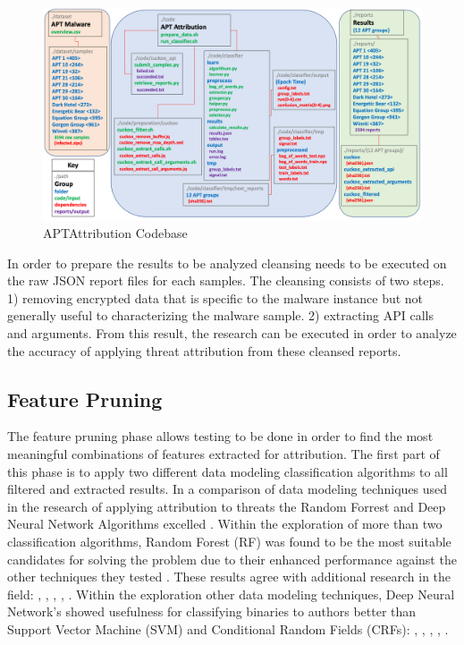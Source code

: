 \documentclass[12pt]{report}
\begin{document}
\begin{figure}
	\centering
	\includegraphics[width=1\textwidth]{images/APTAttribution-codebase.png}
	\caption{APTAttribution Codebase \protect\cite{APTAttribution2022}}
	\label{fig:APTAttribution-codebase}
\end{figure}

In order to prepare the results to be analyzed cleansing needs to be executed on the raw JSON report files for each samples.  The cleansing consists of two steps.  1) removing encrypted data that is specific to the malware instance but not generally useful to characterizing the malware sample.  2) extracting API calls and arguments.  From this result, the research can be executed in order to analyze the accuracy of applying threat attribution from these cleansed reports.

\subsection{Feature Pruning}

The feature pruning phase allows testing to be done in order to find the most meaningful combinations of features extracted for attribution.  The first part of this phase is to apply two different data modeling classification algorithms to all filtered and extracted results.  In a comparison of data modeling techniques used in the research of applying attribution to threats the Random Forrest and Deep Neural Network Algorithms excelled \cite{gray2021identifying}.  Within the exploration of more than two classification algorithms, Random Forest (RF) was found to be the most suitable candidates for solving the problem due to their enhanced performance against the other techniques they tested  \cite{hong2018classifying}.  These results agree with additional research in the field: \cite{hendrikse2017effect}, \cite{caliskan2015coding}, \cite{kalgutkar2018android}, \cite{meng2016fine}, \cite{gonzalez2018authorship}.  Within the exploration other data modeling techniques, Deep Neural Network's showed usefulness for classifying binaries to authors better than Support Vector Machine (SVM) and Conditional Random Fields (CRFs): \cite{meng2018binary}, \cite{rosenberg2017deepapt}, \cite{rosenberg2018end}, \cite{alrabaee2019feasibility}, \cite{alrabaee2019bineye}.
\end{document}

